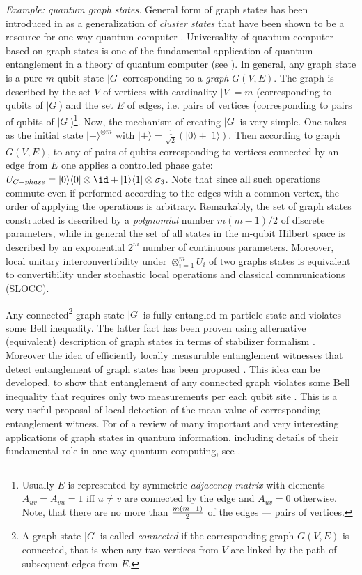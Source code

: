 \documentclass[rmp,12pt,preprint]{revtex4-2}
\begin{document}
{\it Example: quantum graph states.} General form of graph states
has been introduced in \cite{RaussendorfEtAlGraphIntroduced2003} as
a generalization of {\it cluster states}
\cite{BriegelRaussendorfClaster} that have been shown to be a
resource for one-way quantum computer
\cite{RaussendorfBriegelOneWay}. Universality of quantum computer
based on graph states is one of the fundamental application of
quantum entanglement in a theory of quantum computer (see
\cite{GraphStates}). In general, any graph state is a pure $m$-qubit
state $|G\>$ corresponding to a {\it graph} $G(V,E)$. The graph is
described  by the set $V$ of vertices with cardinality $|V|=m$
 (corresponding to qubits of $|G\>$) and the set
$E$ of edges, i.e. pairs of vertices (corresponding to
pairs of qubits of $|G\>$)\footnote{Usually $E$ is represented by
symmetric {\it adjacency matrix} with elements
$A_{uv}=A_{vu}=1$ iff $u\neq v$ are connected by the edge
and $A_{uv}=0$ otherwise. Note, that there are no more than
$m(m-1)\over 2$ of the edges --- pairs of vertices.}. Now, the
mechanism of creating $|G\>$ is very simple. One takes as the
initial state $|+\rangle^{\otimes m}$ with
$|+\rangle=\frac{1}{\sqrt{2}}(|0\rangle + |1\rangle)$. Then
according to graph $G(V,E)$, to any of pairs of qubits corresponding
to vertices connected by an edge from $E$ one applies a controlled
phase gate: $U_{C-phase}=|0\rangle\langle 0| \otimes \id
+|1\rangle\langle 1| \otimes \sigma_{3}$. Note that since all such
operations commute even if performed according to the edges with a
common vertex, the order of applying the operations is arbitrary.
Remarkably, the set of graph states constructed is described by a
{\it polynomial} number $m(m-1)/2$ of discrete parameters, while in
general the set of all states in the m-qubit Hilbert space is
described by an exponential $2^{m}$ number of continuous parameters.
Moreover, local unitary interconvertibility under
$\otimes_{i=1}^{m}U_{i}$ of two graphs states is equivalent to
convertibility under stochastic local operations and classical
communications (SLOCC).

Any connected\footnote{A graph state $|G\>$ is called {\it connected}
  if the corresponding graph $G(V,E)$ is connected, that is when any
  two vertices from $V$ are linked by the path of subsequent edges
  from $E$.} graph state $|G\>$ is fully entangled m-particle state
and violates some Bell inequality. The latter fact has been proven
\cite{GraphBellStabiliser} using alternative (equivalent) description
of graph states in terms of stabilizer formalism \cite{GottesmanPhd}.
Moreover the idea of efficiently locally measurable entanglement
witnesses that detect entanglement of graph states has been proposed
\cite{TothG_s}. This idea can be developed, to show that entanglement
of any connected graph violates some Bell inequality that requires
only two measurements per each qubit site \cite{TothGB2006}. This is a
very useful proposal of local detection of the mean value of
corresponding entanglement witness. For of a review of many important
and very interesting applications of graph states in quantum
information, including details of their fundamental role in one-way
quantum computing, see \cite{GraphStates}.
\end{document}
